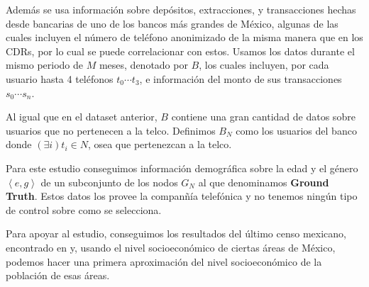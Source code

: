 \documentclass[
11pt,
spanish,
singlespacing, %
parskip, %
headsepline, %
]{MastersDoctoralThesis} %
\begin{document}
Adem\'as se usa informaci\'on sobre dep\'ositos, extracciones, y transacciones hechas desde bancarias de uno de los bancos m\'as grandes de M\'exico, algunas de las cuales incluyen el n\'umero de tel\'efono anonimizado de la misma manera que en los CDRs, por lo cual se puede correlacionar con estos. Usamos los datos durante el mismo periodo de \( M \) meses, denotado por \( B \), los cuales incluyen, por cada usuario hasta 4 tel\'efonos \( t_0 \cdots t_3 \), e informaci\'on del monto de sus transacciones \( s_0 \cdots s_n \).

Al igual que en el dataset anterior, \( B \) contiene una gran cantidad de datos sobre usuarios que no pertenecen a la telco. Definimos \( B_N \) como los usuarios del banco donde \( \left( \exists i \right) t_i \in N \), osea que pertenezcan a la telco.

Para este estudio conseguimos informaci\'on demogr\'afica sobre la edad y el g\'enero \( \left<e, g\right> \) de un subconjunto de los nodos \( G_N \) al que denominamos \textbf{Ground Truth}. Estos datos los provee la compan\~n\'ia telef\'onica y no tenemos ning\'un tipo de control sobre como se selecciona.

Para apoyar al estudio, conseguimos los resultados del \'ultimo censo mexicano, encontrado en  y, usando el nivel socioecon\'omico de ciertas \'areas de M\'exico, podemos hacer una primera aproximaci\'on del nivel socioecon\'omico de la poblaci\'on de esas \'areas.
\end{document}
